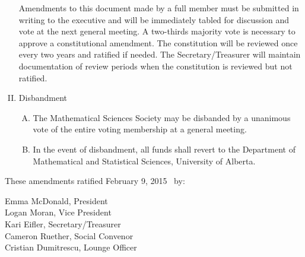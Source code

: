 \documentclass[11pt]{article}
\begin{document}
\begin{enumerate}[I.]
    Amendments to this document made by a full member must be submitted in
    writing to the executive and will be immediately tabled for discussion and
    vote at the next general meeting. A two-thirds majority vote is necessary
    to approve a constitutional amendment. The constitution will be reviewed
    once every two years and ratified if needed. The Secretary/Treasurer will
    maintain documentation of review periods when the constitution is reviewed
    but not ratified. 
  \item Disbandment
    \begin{enumerate}[A)]
      \item The Mathematical Sciences Society may be disbanded by a unanimous
        vote of the entire voting membership at a general meeting. 
      \item  In the event of disbandment, all funds shall revert to the
        Department of Mathematical and Statistical Sciences, University of
        Alberta. 
    \end{enumerate}
\end{enumerate}

These amendments ratified February 9, 2015 \  by:

Emma McDonald, President\\
Logan Moran, Vice President\\
Kari Eifler, Secretary/Treasurer\\
Cameron Ruether, Social Convenor\\
Cristian Dumitrescu, Lounge Officer
\end{document}
